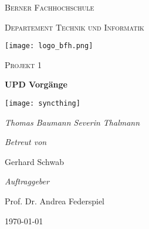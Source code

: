 \documentclass[11pt,DIV=12]{scrreprt}
\begin{document}
\begin{titlepage}
	\centering
	{\scshape\LARGE Berner Fachhochschule \par}
	{\scshape\Large Departement Technik und Informatik \par}
	\vspace{0.75cm}
	\texttt{[image: logo\_bfh.png]}\par
	\vspace{1.5cm}
        {\scshape\Large Projekt 1 \par}
	{\huge\bfseries UPD Vorgänge\par}
	\vspace{1.1cm}
	\texttt{[image: syncthing]}\par
	\vspace{1cm}
	{\Large\itshape Thomas Baumann
	\hspace{1.5cm}
	 Severin Thalmann\par}
	\vspace{1.5cm}
	{\itshape Betreut von\par}
	Gerhard Schwab\par
	\vspace{1cm}
        {\itshape Auftraggeber\par}
       	Prof. Dr. Andrea Federspiel

        \vfill

	{\large \today\par}
\end{titlepage}


\end{document}
